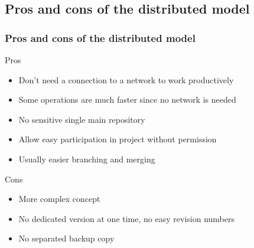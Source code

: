\documentclass{beamer}
\begin{document}
\subsection{Pros and cons of the distributed model}
\frame
{
  \frametitle{Pros and cons of the distributed model}
  \begin{block}{Pros}
    \begin{itemize}
      \item Don't need a connection to a network to work productively
      \item Some operations are much faster since no network is needed
      \item No sensitive single main repository
      \item Allow easy participation in project without permission
      \item Usually easier branching and merging
    \end{itemize}
  \end{block}
  \begin{block}{Cons}
    \begin{itemize}
      \item More complex concept
      \item No dedicated version at one time, no easy revision numbers
      \item No separated backup copy
    \end{itemize}
  \end{block}

}
\end{document}

